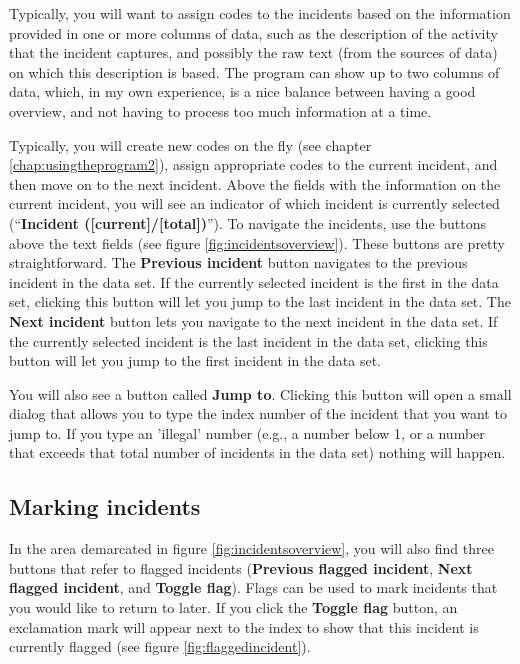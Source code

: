 \documentclass{memoir}
\begin{document}
Typically, you will want to assign codes to the incidents based on the information provided in one or more columns of data, such as the description of the activity that the incident captures, and possibly the raw text (from the sources of data) on which this description is based. The program can show up to two columns of data, which, in my own experience, is a nice balance between having a good overview, and not having to process too much information at a time.

Typically, you will create new codes on the fly (see chapter \ref{chap:usingtheprogram2}), assign appropriate codes to the current incident, and then move on to the next incident. Above the fields with the information on the current incident, you will see an indicator of which incident is currently selected (``\textbf{Incident ([current]/[total])}''). To navigate the incidents, use the buttons above the text fields (see figure \ref{fig:incidentsoverview}). These buttons are pretty straightforward. The \textbf{Previous incident} button navigates to the previous incident in the data set. If the currently selected incident is the first in the data set, clicking this button will let you jump to the last incident in the data set. The \textbf{Next incident} button lets you navigate to the next incident in the data set. If the currently selected incident is the last incident in the data set, clicking this button will let you jump to the first incident in the data set.

You will also see a button called \textbf{Jump to}. Clicking this button will open a small dialog that allows you to type the index number of the incident that you want to jump to. If you type an 'illegal' number (e.g., a number below 1, or a number that exceeds that total number of incidents in the data set) nothing will happen. 

\subsection{Marking incidents}
\label{sec:markingincidents}

In the area demarcated in figure \ref{fig:incidentsoverview}, you will also find three buttons that refer to flagged incidents (\textbf{Previous flagged incident}, \textbf{Next flagged incident}, and \textbf{Toggle flag}). Flags can be used to mark incidents that you would like to return to later. If you click the \textbf{Toggle flag} button, an exclamation mark will appear next to the index to show that this incident is currently flagged (see figure \ref{fig:flaggedincident}).
\end{document}
